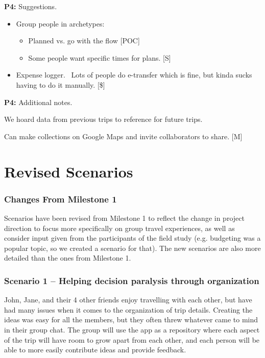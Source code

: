 \documentclass[12pt,a4paper]{article}
\begin{document}
\textbf{P4:} Suggestions.

\begin{itemize}
    \item Group people in archetypes:
    \begin{itemize}
        \item Planned vs. go with the flow [POC]
        \item Some people want specific times for plans. [S]
    \end{itemize}
    \item Expense logger. 
Lots of people do e-transfer which is fine, but kinda sucks having to do it manually. [\$]

\end{itemize}

\textbf{P4:} Additional notes.

We hoard data from previous trips to reference for future trips. 

Can make collections on Google Maps and invite collaborators to share. [M] 

\section{Revised Scenarios}
\label{app:scenarios}
\subsubsection{Changes From Milestone 1}

Scenarios have been revised from Milestone 1 to reflect the change in project direction to focus more specifically on group travel experiences, as well as consider input given from the participants of the field study (e.g. budgeting was a popular topic, so we created a scenario for that). The new scenarios are also more detailed than the ones from Milestone 1.

\subsubsection{Scenario 1 -- Helping decision paralysis through organization}

John, Jane, and their 4 other friends enjoy travelling with each other, but have had many issues when it comes to the organization of trip details. Creating the ideas was easy for all the members, but they often threw whatever came to mind in their group chat. The group will use the app as a repository where each aspect of the trip will have room to grow apart from each other, and each person will be able to more easily contribute ideas and provide feedback.
\end{document}
